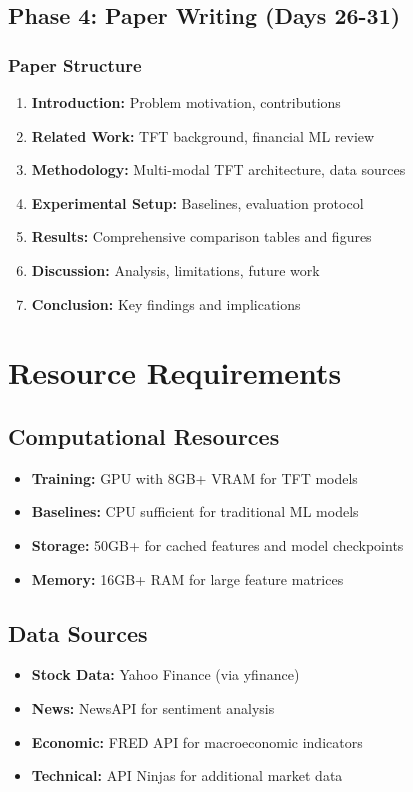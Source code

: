 \documentclass[11pt]{article}
\begin{document}
\subsection{Phase 4: Paper Writing (Days 26-31)}

\subsubsection{Paper Structure}
\begin{enumerate}
    \item \textbf{Introduction:} Problem motivation, contributions
    \item \textbf{Related Work:} TFT background, financial ML review
    \item \textbf{Methodology:} Multi-modal TFT architecture, data sources
    \item \textbf{Experimental Setup:} Baselines, evaluation protocol
    \item \textbf{Results:} Comprehensive comparison tables and figures
    \item \textbf{Discussion:} Analysis, limitations, future work
    \item \textbf{Conclusion:} Key findings and implications
\end{enumerate}

\section{Resource Requirements}

\subsection{Computational Resources}
\begin{itemize}
    \item \textbf{Training:} GPU with 8GB+ VRAM for TFT models
    \item \textbf{Baselines:} CPU sufficient for traditional ML models
    \item \textbf{Storage:} 50GB+ for cached features and model checkpoints
    \item \textbf{Memory:} 16GB+ RAM for large feature matrices
\end{itemize}

\subsection{Data Sources}
\begin{itemize}
    \item \textbf{Stock Data:} Yahoo Finance (via yfinance)
    \item \textbf{News:} NewsAPI for sentiment analysis
    \item \textbf{Economic:} FRED API for macroeconomic indicators
    \item \textbf{Technical:} API Ninjas for additional market data
\end{itemize}
\end{document}
